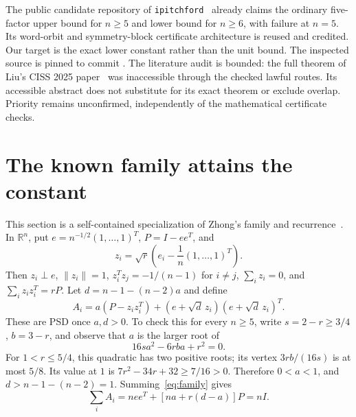 \documentclass[11pt]{article}
\newcommand{\R}{\mathbb R}
\begin{document}
The public candidate repository of \texttt{ipitchford}~\cite{pitchford}
already claims the ordinary five-factor upper bound for $n\ge5$ and lower
bound for $n\ge6$, with failure at $n=5$. Its word-orbit and symmetry-block
certificate architecture is reused and credited. Our target is the exact
lower constant rather than the unit bound. The inspected source is pinned
to commit .
The literature audit is bounded: the full theorem of Liu's CISS 2025
paper~\cite{liu} was inaccessible through the checked lawful routes.
Its accessible abstract does not substitute for its exact theorem or exclude
overlap. Priority remains
unconfirmed, independently of the mathematical certificate checks.

\section{The known family attains the constant}\label{sec:attainment}
This section is a self-contained specialization of Zhong's family and
recurrence~\cite[Section~1.1 and Appendix~A]{zhong}.
In $\R^n$, put $e=n^{-1/2}(1,\ldots,1)^T$, $P=I-ee^T$, and
\[
 z_i=\sqrt r\left(e_i-\frac1n(1,\ldots,1)^T\right).
\]
Then $z_i\perp e$, $\|z_i\|=1$, $z_i^Tz_j=-1/(n-1)$ for $i\ne j$,
$\sum_i z_i=0$, and $\sum_i z_i z_i^T=rP$.
Let $d=n-1-(n-2)a$ and define
\begin{equation}\label{eq:family}
 A_i=a(P-z_i z_i^T)+(e+\sqrt d\,z_i)(e+\sqrt d\,z_i)^T.
\end{equation}
These are PSD once $a,d>0$. To check this for every $n\ge5$, write
$s=2-r\ge3/4$, $b=3-r$, and observe that $a$ is the larger root of
\begin{equation}\label{eq:stationarity}
 16s a^2-6rb a+r^2=0.
\end{equation}
For $1<r\le5/4$, this quadratic has two positive roots; its vertex
$3rb/(16s)$ is at most $5/8$. Its value at $1$ is
$7r^2-34r+32\ge7/16>0$. Therefore $0<a<1$, and
$d>n-1-(n-2)=1$. Summing~\eqref{eq:family} gives
\[
 \sum_i A_i=n ee^T+[na+r(d-a)]P=nI.
\]
\end{document}
